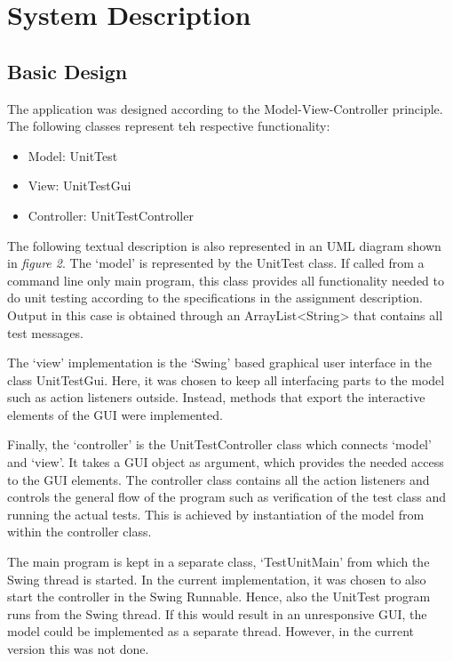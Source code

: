 \documentclass[a4paper,11pt,twoside]{article}
\begin{document}
\section{System Description}
\subsection{Basic Design}
The application was designed according to the Model-View-Controller principle. The following classes represent teh respective functionality:

\begin{itemize}
\item Model: UnitTest
\item View: UnitTestGui
\item Controller: UnitTestController
\end{itemize}


The following textual description is also represented in an UML diagram shown in \textit{figure 2}. The `model' is represented by the UnitTest class. If called from a command line only main program, this class provides all functionality needed to do unit testing according to the specifications in the assignment description. Output in this case is obtained through an ArrayList<String> that contains all test messages.

The `view' implementation is the `Swing' based graphical user interface in the class UnitTestGui. Here, it was chosen to keep all interfacing parts to the model such as action listeners outside. Instead, methods that export the interactive elements of the GUI were implemented.

Finally, the `controller' is the UnitTestController class which connects `model' and `view'. It takes a GUI object as argument, which provides the needed access to the GUI elements. The controller class contains all the action listeners and controls the general flow of the program such as verification of the test class and running the actual tests. This is achieved by instantiation of the model from within the controller class.

The main program is kept in a separate class, `TestUnitMain' from which the Swing thread is started. In the current implementation, it was chosen to also start the controller in the Swing Runnable. Hence, also the UnitTest program runs from the Swing thread. If this would result in an unresponsive GUI, the model could be implemented as a separate thread. However, in the current version this was not done. 
\end{document}
